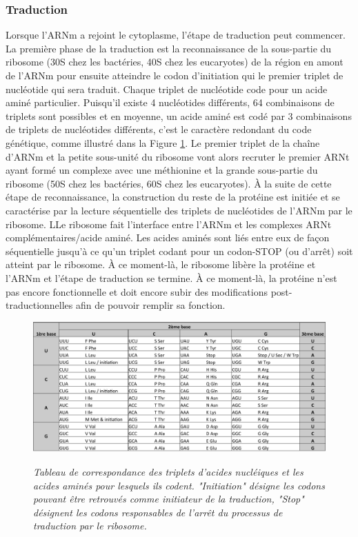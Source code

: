 \subsubsection{Traduction}

Lorsque l'ARNm a rejoint le cytoplasme, l'étape de traduction peut commencer. La première phase de la traduction est la reconnaissance de la sous-partie du ribosome (30S chez les bactéries, 40S chez les eucaryotes) de la région en amont de l'ARNm pour ensuite atteindre le codon d'initiation qui le premier triplet de nucléotide qui sera traduit. Chaque triplet de nucléotide code pour un acide aminé particulier. Puisqu'il existe 4 nucléotides différents, 64 combinaisons de triplets sont possibles et en moyenne, un acide aminé est codé par 3 combinaisons de triplets de nucléotides différents, c'est le caractère redondant du code génétique, comme illustré dans la Figure \ref{Fig:codon_table}. 
Le premier triplet de la chaîne d'ARNm et la petite sous-unité du ribosome vont alors recruter le premier ARNt ayant formé un complexe avec une méthionine et la grande sous-partie du ribosome (50S chez les bactéries, 60S chez les eucaryotes). À la suite de cette étape de reconnaissance, la construction du reste de la protéine est initiée et se caractérise par la lecture séquentielle des triplets de nucléotides de l'ARNm par le ribosome. LLe ribosome fait l'interface entre l'ARNm et les complexes ARNt complémentaires/acide aminé. Les acides aminés sont liés entre eux de façon séquentielle jusqu'à ce qu'un triplet codant pour un codon-STOP (ou d'arrêt) soit atteint par le ribosome. À ce moment-là, le ribosome libère la protéine et l'ARNm et l'étape de traduction se termine. À ce moment-là, la protéine n'est pas encore fonctionnelle et doit encore subir des modifications post-traductionnelles afin de pouvoir remplir sa fonction.

\begin{figure}
  \centering
  {\includegraphics[width=0.75\linewidth]{./figures/ch1/codon_table.pdf}}
    \caption{\it Tableau de correspondance des triplets d'acides nucléiques et les acides aminés pour lesquels ils codent. "Initiation" désigne les codons pouvant être retrouvés comme initiateur de la traduction, "Stop" désignent les codons responsables de l'arrêt du processus de traduction par le ribosome.}
    \label{Fig:codon_table}
  \hspace{0.3cm}
\end{figure}

